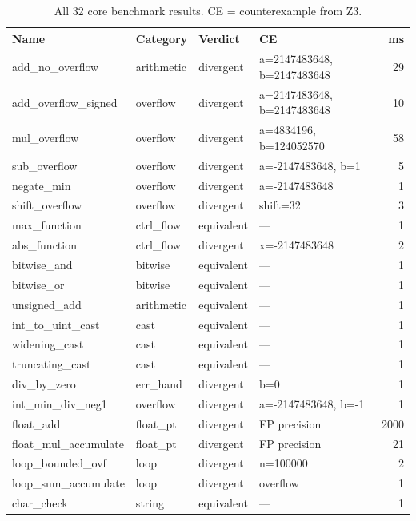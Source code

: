 \documentclass[11pt,a4paper]{article}
\begin{document}
\begin{appendices}
\begin{table}[h]
\centering
\small
\caption{All 32 core benchmark results.  CE = counterexample from Z3.}
\label{tab:core-detail}
\begin{tabular}{@{}llllr@{}}
\toprule
Name & Category & Verdict & CE & ms \\
\midrule
add\_no\_overflow        & arithmetic & divergent & a=2147483648, b=2147483648 & 29 \\
add\_overflow\_signed    & overflow   & divergent & a=2147483648, b=2147483648 & 10 \\
mul\_overflow            & overflow   & divergent & a=4834196, b=124052570 & 58 \\
sub\_overflow            & overflow   & divergent & a=-2147483648, b=1 & 5 \\
negate\_min              & overflow   & divergent & a=-2147483648 & 1 \\
shift\_overflow          & overflow   & divergent & shift=32 & 3 \\
max\_function            & ctrl\_flow & equivalent & --- & 1 \\
abs\_function            & ctrl\_flow & divergent & x=-2147483648 & 2 \\
bitwise\_and             & bitwise    & equivalent & --- & 1 \\
bitwise\_or              & bitwise    & equivalent & --- & 1 \\
unsigned\_add            & arithmetic & equivalent & --- & 1 \\
int\_to\_uint\_cast      & cast       & equivalent & --- & 1 \\
widening\_cast           & cast       & equivalent & --- & 1 \\
truncating\_cast         & cast       & equivalent & --- & 1 \\
div\_by\_zero            & err\_hand  & divergent & b=0 & 1 \\
int\_min\_div\_neg1      & overflow   & divergent & a=-2147483648, b=-1 & 1 \\
float\_add               & float\_pt  & divergent & FP precision & 2000 \\
float\_mul\_accumulate   & float\_pt  & divergent & FP precision & 21 \\
loop_bounded_ovf & loop & divergent & n=100000 & 2 \\
loop\_sum\_accumulate    & loop       & divergent & overflow & 1 \\
char\_check              & string     & equivalent & --- & 1 \\

\end{tabular}
\end{table}
\end{appendices}
\end{document}
